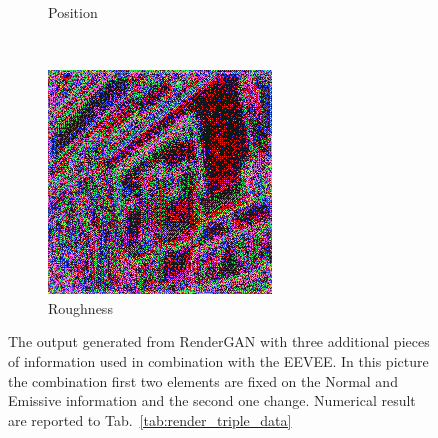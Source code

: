 \begin{figure}[h!]
\begin{subfigure}[b]{0.175\textwidth}
     \caption{Position}
    \end{subfigure}
    ~
    \begin{subfigure}[b]{0.175\textwidth}
     \includegraphics[width=\textwidth]{figures/result/triple/normal_emissive_roughness/3.png}
     \caption{Roughness}
    \end{subfigure}
    \caption[Generation Result with fixed input on Normal and Emissive]{The output generated from RenderGAN with three additional pieces of information used in combination with the EEVEE. In this picture the combination first two elements are fixed on the Normal and Emissive information and the second one change. Numerical result are reported to Tab.~\ref{tab:render_triple_data}}
    \label{fig:triple_input_base_normal_emissive}
\end{figure}

